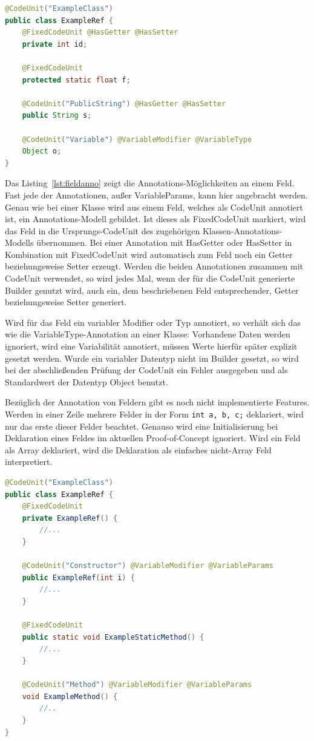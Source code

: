 \documentclass[12pt,oneside,a4paper,parskip]{scrbook}
\begin{document}
\begin{lstlisting}[label=lst:fieldanno,
language=java,
firstnumber=1,
caption=Darstellung der Annotations-Möglichkeiten an einem Feld.]
@CodeUnit("ExampleClass")
public class ExampleRef {
	@FixedCodeUnit @HasGetter @HasSetter
	private int id;
	
	@FixedCodeUnit
	protected static float f;
	
	@CodeUnit("PublicString") @HasGetter @HasSetter
	public String s;
	
	@CodeUnit("Variable") @VariableModifier @VariableType
	Object o;
}
\end{lstlisting}

Das Listing~\ref{lst:fieldanno} zeigt die Annotations-Möglichkeiten an einem Feld. Fast jede der Annotationen, außer VariableParams, kann hier angebracht werden. Genau wie bei einer Klasse wird aus einem Feld, welches als CodeUnit annotiert ist, ein Annotations-Modell gebildet. Ist dieses als FixedCodeUnit markiert, wird das Feld in die Ursprungs-CodeUnit des zugehörigen Klassen-Annotations-Modells übernommen. Bei einer Annotation mit HasGetter oder HasSetter in Kombination mit FixedCodeUnit wird automatisch zum Feld noch ein Getter beziehungsweise Setter erzeugt. Werden die beiden Annotationen zusammen mit CodeUnit verwendet, so wird jedes Mal, wenn der für die CodeUnit generierte Builder genutzt wird, auch ein, dem beschriebenen Feld entsprechender, Getter beziehungsweise Setter generiert.

Wird für das Feld ein variabler Modifier oder Typ annotiert, so verhält sich das wie die VariableType-Annotation an einer Klasse: Vorhandene Daten werden ignoriert, wird eine Variabilität annotiert, müssen Werte hierfür später explizit gesetzt werden. Wurde ein variabler Datentyp nicht im Builder gesetzt, so wird bei der abschließenden Prüfung der CodeUnit ein Fehler ausgegeben und als Standardwert der Datentyp Object benutzt.

Bezüglich der Annotation von Feldern gibt es noch nicht implementierte Features. Werden in einer Zeile mehrere Felder in der Form \texttt{int a, b, c;} deklariert, wird nur das erste dieser Felder beachtet. Genauso wird eine Initialisierung bei Deklaration eines Feldes im aktuellen Proof-of-Concept ignoriert. Wird ein Feld als Array deklariert, wird die Deklaration als einfaches nicht-Array Feld interpretiert.

\begin{lstlisting}[label=lst:constrmethoanno,
language=java,
firstnumber=1,
caption=Darstellung der Annotations-Möglichkeiten von Konstruktoren und Methoden.]
@CodeUnit("ExampleClass")
public class ExampleRef {
	@FixedCodeUnit
	private ExampleRef() {
		//...
	}
	
	@CodeUnit("Constructor") @VariableModifier @VariableParams
	public ExampleRef(int i) {
		//...
	}
	
	@FixedCodeUnit
	public static void ExampleStaticMethod() {
		//...
	}
	
	@CodeUnit("Method") @VariableModifier @VariableParams
	void ExampleMethod() {
		//..
	}
}
\end{lstlisting}
\end{document}
